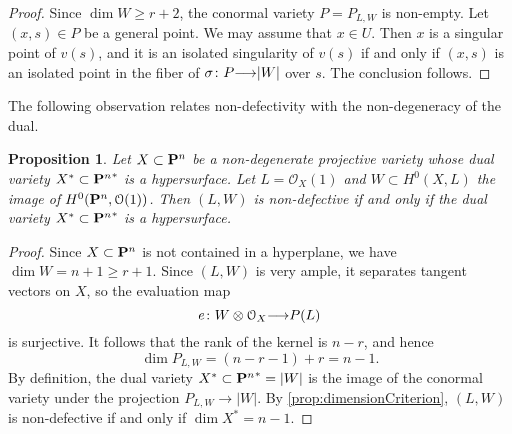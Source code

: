 \documentclass[11pt,reqno]{amsart}
\theoremstyle{plain}
\newtheorem{proposition}[theorem]{Proposition}
\theoremstyle{definition}
\theoremstyle{remark}
\numberwithin{equation}{section}
\renewcommand{\to}{{\longrightarrow}}
\numberwithin{equation}{section}
\renewcommand{\O}{\mathcal O}
\begin{document}
\begin{proof}
  Since $\dim W \geq r+2$, the conormal variety $P = P_{L,W}$ is non-empty.
  Let $(x,s) \in P$ be a general point.
  We may assume that $x \in U$.
  Then $x$ is a singular point of $v(s)$, and it is an isolated singularity of $v(s)$ if and only if $(x,s)$ is an isolated point in the fiber of $\sigma \from P \to |W|$ over $s$.
  The conclusion follows.
\end{proof}

The following observation relates non-defectivity with the non-degeneracy of the dual.
\begin{proposition}\label{prop:non-deg-dual}
  Let $X \subset \P^n$ be a non-degenerate projective variety whose dual variety $X^* \subset {\P^{n}}^*$ is a hypersurface.
  Let $L = \O_X(1)$ and $W \subset H^0(X, L)$ the image of $H^0(\P^n, \O(1))$.
  Then $(L, W)$ is non-defective if and only if the dual variety $X^* \subset {\P^n}^*$ is a hypersurface.
\end{proposition}
\begin{proof}
  Since $X \subset \P^n$ is not contained in a hyperplane, we have $\dim W = n+1 \geq r+1$.
  Since $(L, W)$ is very ample, it separates tangent vectors on $X$, so the evaluation map
  \[ e \from W \otimes \O_X \to P(L)  \]
  is surjective.
  It follows that the rank of the kernel is $n-r$, and hence
  \[ \dim P_{L,W} = (n-r - 1) + r = n-1.\]
  By definition, the dual variety $X^* \subset {\P^n}^* = |W|$ is the image of the conormal variety under the projection $P_{L,W} \to |W|$.
  By \autoref{prop:dimensionCriterion}, $(L, W)$ is non-defective if and only if $\dim X^* = n-1$.
\end{proof}
\end{document}
